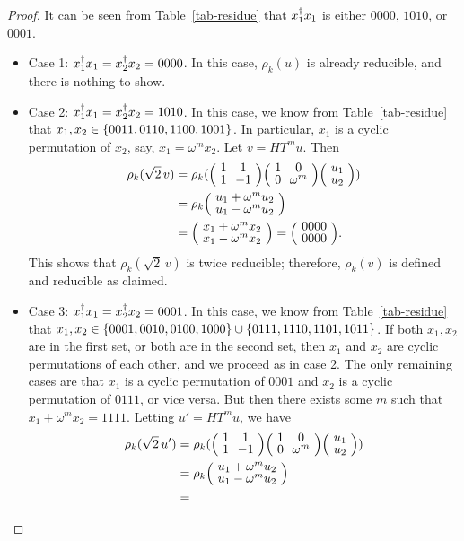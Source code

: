 \begin{proof}
  It can be seen from Table~\ref{tab-residue} that $x_1^{\dagger} x_1$ is either $0000$, $1010$, or $0001$.
  \begin{itemize}
  \item Case 1: $x_1^{\dagger} x_1 = x_2^{\dagger} x_2 = 0000$. In this case, $\rho_k(u)$ is already reducible,
    and there is nothing to show.
  \item Case 2: $x_1^{\dagger} x_1 = x_2^{\dagger} x_2 = 1010$. In this case, we know from
    Table~\ref{tab-residue} that $x_1,x_2\in\{0011, 0110, 1100, 1001\}$. In particular, $x_1$ is a
    cyclic permutation of $x_2$, say, $x_1=\omega^m x_2$. Let $v=HT^mu$. Then
    \[
      \begin{split}
        \rho_k(\sqrt{2}\,v) &=
        \rho_k(\zmatrix{cc}{1&1\\1&-1}\zmatrix{cc}{1&0\\0&\omega^m}\zmatrix{c}{u_1\\u_2})
        \\&= \rho_k\zmatrix{c}{u_1+\omega^m u_2\\ u_1-\omega^m u_2} \\&=
        \zmatrix{c}{x_1+\omega^m x_2\\x_1-\omega^m x_2} =
        \zmatrix{c}{0000\\0000}.
      \end{split}
    \]
    This shows that $\rho_k(\sqrt{2}\,v)$ is twice reducible; therefore, $\rho_k(v)$ is defined and
    reducible as claimed.
  \item Case 3: $x_1^{\dagger} x_1 = x_2^{\dagger} x_2 = 0001$. In this case, we know from Table~\ref{tab-residue}
    that $x_1,x_2\in\{0001,0010,0100,1000\}\cup\{0111,1110,1101,1011\}$. If both $x_1,x_2$ are in
    the first set, or both are in the second set, then $x_1$ and $x_2$ are cyclic permutations of
    each other, and we proceed as in case 2. The only remaining cases are that $x_1$ is a cyclic
    permutation of $0001$ and $x_2$ is a cyclic permutation of $0111$, or vice versa. But then
    there exists some $m$ such that $x_1+\omega^mx_2=1111$. Letting $u'=HT^mu$, we have
    \[
      \begin{split}
        \rho_k(\sqrt{2}\,u') &=
        \rho_k(\zmatrix{cc}{1&1\\1&-1}\zmatrix{cc}{1&0\\0&\omega^m}\zmatrix{c}{u_1\\u_2})
        \\&= \rho_k\zmatrix{c}{u_1+\omega^m u_2\\ u_1-\omega^m u_2} \\&=

\end{split}\]
\end{itemize}
\end{proof}
